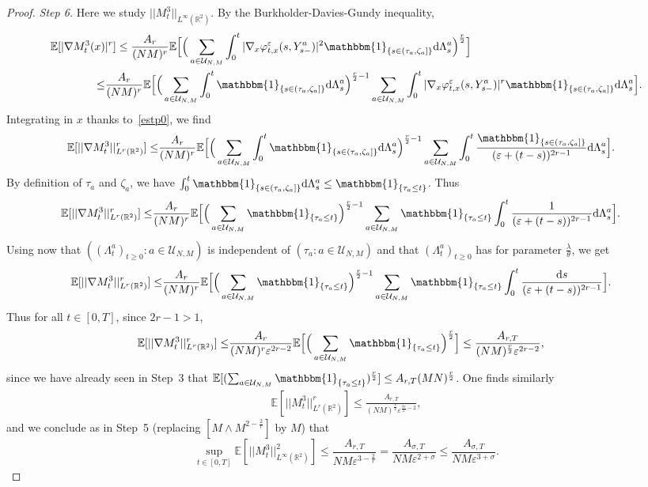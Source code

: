 \documentclass[11pt]{article}
\newcommand{\E}{\mathbb{E}}
\newcommand{\R}{\mathbb{R}}
\newcommand{\1}{\mathbbm{1}}
\newcommand{\dd}{{\rm d}}
\newcommand{\Uu}{\mathcal U}
\newcommand{\e}{\varepsilon}
\newcommand{\sm}{{s-}}
\begin{document}
\begin{proof}
{\it Step 6.} Here we study $||M^3_t||_{L^\infty(\R^2)}$. By the Burkholder-Davies-Gundy inequality,
\begin{align*}
\E[|\nabla M^3_t(x)&|^r]\leq \frac{A_r}{(NM)^r} \E\Big[\Big(\sum_{a \in \Uu_{N,M}}\int_0^t
|\nabla_x \varphi^\e_{t,x}(s,Y^a_\sm)|^2 \1_{\{s \in (\tau_a,\zeta_a]\}} \dd \Lambda^a_s \Big)^{\frac r2}\Big]\\
\leq &  \frac{A_r}{(NM)^r} \E\Big[\Big(\sum_{a \in \Uu_{N,M}}\int_0^t
\1_{\{s \in (\tau_a,\zeta_a]\}}\dd \Lambda^a_s \Big)^{\frac r2-1}  \sum_{a \in \Uu_{N,M}}\int_0^t
|\nabla_x \varphi^\e_{t,x}(s,Y^a_\sm)|^r \1_{\{s \in (\tau_a,\zeta_a]\}}\dd \Lambda^a_s \Big].
\end{align*}
Integrating in $x$ thanks to~\eqref{estp0}, we find
\begin{align*}
\E[||\nabla M^3_t||_{L^r(\R^2)}^r]\leq& \frac{A_r}{(NM)^r} \E\Big[\Big(\sum_{a \in \Uu_{N,M}}\int_0^t
\1_{\{s \in (\tau_a,\zeta_a]\}}\dd \Lambda^a_s \Big)^{\frac r2-1}  \sum_{a \in \Uu_{N,M}}\int_0^t
\frac {\1_{\{s \in (\tau_a,\zeta_a]\}}}{(\e+(t-s))^{2r-1}} \dd \Lambda^a_s \Big].
\end{align*}
By definition of $\tau_a$ and $\zeta_a$, we have 
$\int_0^t\1_{\{s \in (\tau_a,\zeta_a]\}}\dd \Lambda^a_s\leq \1_{\{\tau_a\leq t\}}$. Thus
\begin{align*}
\E[||\nabla M^3_t||_{L^r(\R^2)}^r]\leq& \frac{A_r}{(NM)^r} \E\Big[\Big(\sum_{a \in \Uu_{N,M}} \1_{\{\tau_a \leq t\}} 
\Big)^{\frac r2-1}  
\sum_{a \in \Uu_{N,M}}\1_{\{\tau_a\leq t\}} \int_0^t \frac {1}{(\e+(t-s))^{2r-1}} \dd \Lambda^a_s \Big].
\end{align*}
Using now that $((\Lambda^a_t)_{t\geq 0} : a \in \Uu_{N,M})$ is independent of $(\tau_a :  a \in \Uu_{N,M})$
and that $(\Lambda^a_t)_{t\geq 0}$ has for parameter $\frac\lambda\theta$, we get
\begin{align*}
\E[||\nabla M^3_t||_{L^r(\R^2)}^r]\leq& \frac{A_{r}}{(NM)^r} 
\E\Big[\Big(\sum_{a \in \Uu_{N,M}} \1_{\{\tau_a\leq t\}} \Big)^{\frac r2-1}\sum_{a \in \Uu_{N,M}}\1_{\{\tau_a\leq t\}} 
\int_0^t \frac {\dd s}{(\e+(t-s))^{2r-1}} \Big].
\end{align*}
Thus for all $t\in [0,T]$, since $2r-1>1$,
\begin{align*}
\E[||\nabla M^3_t||_{L^r(\R^2)}^r]\leq& \frac{A_r}{(NM)^r\e^{2r-2}} 
\E\Big[\Big(\sum_{a \in \Uu_{N,M}} \1_{\{\tau_a\leq t\}} \Big)^{\frac r2}\Big] \leq 
\frac{A_{r,T}}{(NM)^{\frac r2}\e^{2r-2}}, 
\end{align*}
since we have already seen in Step~3 that 
$\E[(\sum_{a \in \Uu_{N,M}} \1_{\{\tau_a\leq t\}})^{\frac r2}]\leq A_{r,T} (MN)^{\frac r 2}$. One finds similarly
\begin{align*}
\E[||M^3_t||_{L^r(\R^2)}^r]\leq  \frac{A_{r,T}} {(NM)^{\frac r2}\e^{\frac{3r}2-2}}, 
\end{align*}
and we conclude as in Step~5 (replacing $[M \land M^{2-\frac2r}]$ by $M$) that
\begin{equation*}
\sup_{t\in [0,T]}\E[||M^3_t||_{L^\infty(\R^2)}^2]\leq \frac{A_{r,T}}{NM\e^{3-\frac 2 r}}
= \frac{A_{\sigma,T}}{NM\e^{2+\sigma}}\leq\frac{A_{\sigma,T}}{NM\e^{3+\sigma}}.
\end{equation*}


\end{proof}
\end{document}

